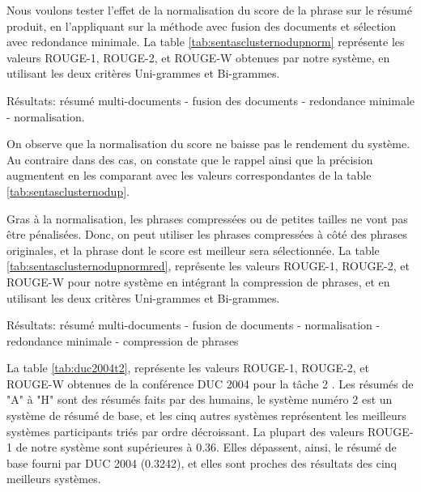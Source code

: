 \documentclass[a4paper,12pt,oneside]{../use/ESIthesis}
\begin{document}
Nous voulons tester l'effet de la normalisation du score de la phrase sur le résumé produit, en l'appliquant sur la méthode avec fusion des documents et sélection avec redondance minimale. 
La table \ref{tab:sentasclusternodupnorm} représente les valeurs ROUGE-1, ROUGE-2, et ROUGE-W obtenues par notre système, en utilisant les deux critères Uni-grammes et Bi-grammes. 
%
\begin{table}[!htbp]
\centering
\caption{Résultats: résumé multi-documents - fusion des documents - redondance minimale - normalisation.}
\label{tab:sentasclusternodupnorm}
\end{table}
%
On observe que la normalisation du score ne baisse pas le rendement du système. 
Au contraire dans des cas, on constate que le rappel ainsi que la précision augmentent en les comparant avec les valeurs correspondantes de la table \ref{tab:sentasclusternodup}.

Gras à la normalisation, les phrases compressées ou de petites tailles ne vont pas être pénalisées. 
Donc, on peut utiliser les phrases compressées à côté des phrases originales, et la phrase dont le score est meilleur sera sélectionnée. 
La table \ref{tab:sentasclusternodupnormred}, représente les valeurs ROUGE-1, ROUGE-2, et ROUGE-W pour notre système en intégrant la compression de phrases, et en utilisant les deux critères Uni-grammes et Bi-grammes.
%
\begin{table}[!htbp]
\centering
\caption{Résultats: résumé multi-documents - fusion de documents - normalisation - redondance minimale - compression de phrases}
\label{tab:sentasclusternodupnormred}
\end{table}

La table \ref{tab:duc2004t2}, représente les valeurs ROUGE-1, ROUGE-2, et ROUGE-W obtenues de la conférence DUC 2004 pour la tâche 2 \cite{04-erkan-radev}. 
Les résumés de "A" à "H" sont des résumés faits par des humains, le système numéro 2 est un système de résumé de base, et les cinq autres systèmes représentent les meilleurs systèmes participants triés par ordre décroissant.
La plupart des valeurs ROUGE-1 de notre système sont supérieures à 0.36. 
Elles dépassent, ainsi, le résumé de base fourni par DUC 2004 (0.3242), et elles sont proches des résultats des cinq meilleurs systèmes.
%
\begin{table}[!htbp]
\centering
\caption [Quelques résultats DUC 2004 pour la tâche 2.] %
{Quelques résultats DUC 2004 pour la tâche 2 \cite{04-erkan-radev}.}
\label{tab:duc2004t2}
\end{table}
\end{document}
